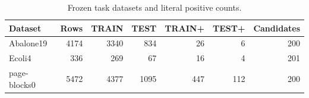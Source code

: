 \begin{table}[!t]
\centering
\caption{Frozen task datasets and literal positive counts.}\label{tab:datasets}
\footnotesize\setlength{\tabcolsep}{3pt}
\begin{tabular}{lrrrrrr}
\toprule
Dataset & Rows & TRAIN & TEST & TRAIN+ & TEST+ & Candidates \\
\midrule
Abalone19 & 4174 & 3340 & 834 & 26 & 6 & 200 \\
Ecoli4 & 336 & 269 & 67 & 16 & 4 & 201 \\
page-blocks0 & 5472 & 4377 & 1095 & 447 & 112 & 200 \\
\bottomrule
\end{tabular}
\end{table}
